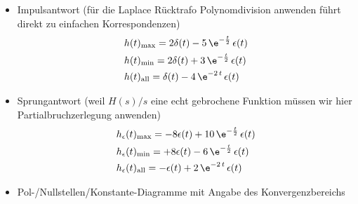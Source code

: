 \begin{itemize}
  \item Impulsantwort (für die Laplace Rücktrafo Polynomdivision anwenden führt direkt zu einfachen Korrespondenzen)
  \begin{align}
  &h(t)_\mathrm{max} = 2\delta(t) - 5\,\e^{-\frac{t}{2}}\,\epsilon(t)\\
  &h(t)_\mathrm{min} = 2\delta(t) + 3\,\e^{-\frac{t}{2}}\,\epsilon(t)\\
  &h(t)_\mathrm{all} = \delta(t) - 4\,\e^{-2\,t}\,\epsilon(t)
  \end{align}
  \item Sprungantwort (weil $H(s)/s$ eine echt gebrochene Funktion müssen wir hier Partialbruchzerlegung anwenden)
  \begin{align}
  &h_\epsilon(t)_\mathrm{max} = -8 \epsilon(t) + 10 \, \e^{-\frac{t}{2}}\,\epsilon(t)\\
  &h_\epsilon(t)_\mathrm{min} = +8 \epsilon(t) -6 \, \e^{-\frac{t}{2}}\,\epsilon(t)\\
  &h_\epsilon(t)_\mathrm{all} = -\epsilon(t) + 2 \, \e^{-2\,t}\,\epsilon(t)
  \end{align}
  \item Pol-/Nullstellen/Konstante-Diagramme mit Angabe des Konvergenzbereichs


\end{itemize}
